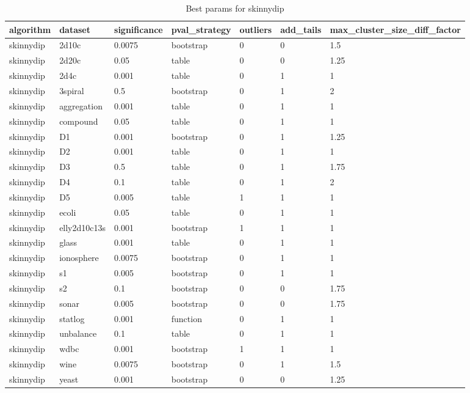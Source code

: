 \begin{table}[H]
\centering
\caption{Best params for skinnydip}
\label{S41_Table}
\begin{tabular}{|l|l|l|l|l|l|l|}
\hline
algorithm & dataset & significance & pval\_strategy & outliers & add\_tails & max\_cluster\_size\_diff\_factor \\
\hline
skinnydip & 2d10c & 0.0075 & bootstrap & 0 & 0 & 1.5 \\
\hline
skinnydip & 2d20c & 0.05 & table & 0 & 0 & 1.25 \\
\hline
skinnydip & 2d4c & 0.001 & table & 0 & 1 & 1 \\
\hline
skinnydip & 3spiral & 0.5 & bootstrap & 0 & 1 & 2 \\
\hline
skinnydip & aggregation & 0.001 & table & 0 & 1 & 1 \\
\hline
skinnydip & compound & 0.05 & table & 0 & 1 & 1 \\
\hline
skinnydip & D1 & 0.001 & bootstrap & 0 & 1 & 1.25 \\
\hline
skinnydip & D2 & 0.001 & table & 0 & 1 & 1 \\
\hline
skinnydip & D3 & 0.5 & table & 0 & 1 & 1.75 \\
\hline
skinnydip & D4 & 0.1 & table & 0 & 1 & 2 \\
\hline
skinnydip & D5 & 0.005 & table & 1 & 1 & 1 \\
\hline
skinnydip & ecoli & 0.05 & table & 0 & 1 & 1 \\
\hline
skinnydip & elly2d10c13s & 0.001 & bootstrap & 1 & 1 & 1 \\
\hline
skinnydip & glass & 0.001 & table & 0 & 1 & 1 \\
\hline
skinnydip & ionosphere & 0.0075 & bootstrap & 0 & 1 & 1 \\
\hline
skinnydip & s1 & 0.005 & bootstrap & 0 & 1 & 1 \\
\hline
skinnydip & s2 & 0.1 & bootstrap & 0 & 0 & 1.75 \\
\hline
skinnydip & sonar & 0.005 & bootstrap & 0 & 0 & 1.75 \\
\hline
skinnydip & statlog & 0.001 & function & 0 & 1 & 1 \\
\hline
skinnydip & unbalance & 0.1 & table & 0 & 1 & 1 \\
\hline
skinnydip & wdbc & 0.001 & bootstrap & 1 & 1 & 1 \\
\hline
skinnydip & wine & 0.0075 & bootstrap & 0 & 1 & 1.5 \\
\hline
skinnydip & yeast & 0.001 & bootstrap & 0 & 0 & 1.25 \\
\hline
\end{tabular}
\end{table}

